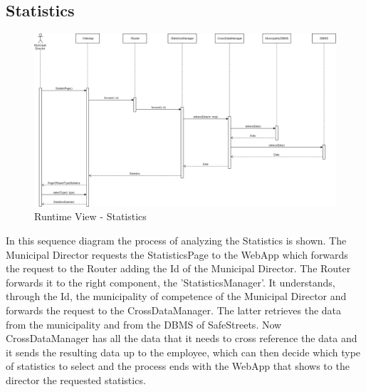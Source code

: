         \subsection{Statistics}
        \begin{figure}[H]
            \includegraphics[scale=0.34]{dd/resources/images/RuntimeView-Statistics}
            \caption{Runtime View - Statistics}
        \end{figure}
        In this sequence diagram the process of analyzing the Statistics is shown. 
        The Municipal Director requests the StatisticsPage to the WebApp which forwards 
        the request to the Router adding the Id of the Municipal Director. The Router 
        forwards it to the right component, the 'StatisticsManager'. It 
        understands, through the Id, the municipality of competence of the Municipal 
        Director and forwards the request to the CrossDataManager. The latter retrieves 
        the data from the municipality and from the DBMS of SafeStreets. Now CrossDataManager 
        has all the data that it needs to cross reference the data and it sends the resulting data up 
        to the employee, which can then decide which type of statistics to select and the 
        process ends with the WebApp that shows to the director the requested statistics.

    \newpage
